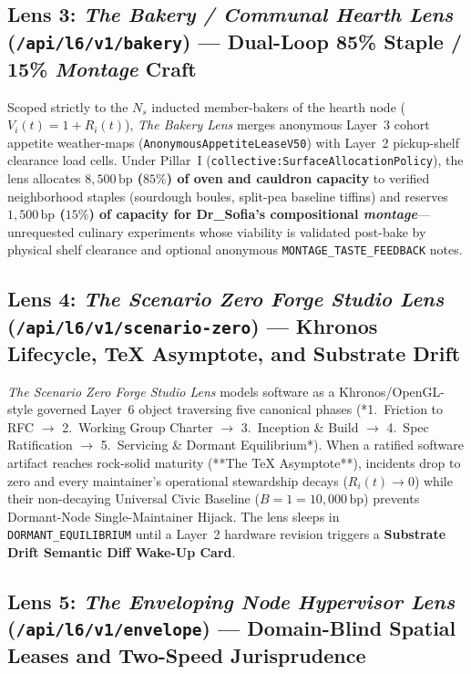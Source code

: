 \begin{enumerate}
\end{enumerate}

\subsection{Lens 3: \textit{The Bakery / Communal Hearth Lens} (\texttt{/api/l6/v1/bakery}) --- Dual-Loop 85\% Staple / 15\% \textit{Montage} Craft}
\label{subsec:lens-bakery}

Scoped strictly to the $N_s$ inducted member-bakers of the hearth node ($V_i(t) = 1 + R_i(t)$), \textit{The Bakery Lens} merges anonymous Layer~3 cohort appetite weather-maps (\texttt{AnonymousAppetiteLeaseV50}) with Layer~2 pickup-shelf clearance load cells. Under Pillar~I (\texttt{collective:SurfaceAllocationPolicy}), the lens allocates \textbf{$8{,}500\,\mathrm{bp}$ ($85\%$) of oven and cauldron capacity} to verified neighborhood staples (sourdough boules, split-pea baseline tiffins) and reserves \textbf{$1{,}500\,\mathrm{bp}$ ($15\%$) of capacity for Dr\_Sofia's compositional \textit{montage}}---unrequested culinary experiments whose viability is validated post-bake by physical shelf clearance and optional anonymous \texttt{MONTAGE\_TASTE\_FEEDBACK} notes.

\subsection{Lens 4: \textit{The Scenario Zero Forge Studio Lens} (\texttt{/api/l6/v1/scenario-zero}) --- Khronos Lifecycle, \TeX{} Asymptote, and Substrate Drift}
\label{subsec:lens-forge-studio}

\textit{The Scenario Zero Forge Studio Lens} models software as a Khronos/OpenGL-style governed Layer~6 object traversing five canonical phases (*1.~Friction to RFC $\to$ 2.~Working Group Charter $\to$ 3.~Inception \& Build $\to$ 4.~Spec Ratification $\to$ 5.~Servicing \& Dormant Equilibrium*). When a ratified software artifact reaches rock-solid maturity (**The \TeX{} Asymptote**), incidents drop to zero and every maintainer's operational stewardship decays ($R_i(t) \to 0$) while their non-decaying Universal Civic Baseline ($B = 1 = 10{,}000\,\mathrm{bp}$) prevents Dormant-Node Single-Maintainer Hijack. The lens sleeps in \texttt{DORMANT\_EQUILIBRIUM} until a Layer~2 hardware revision triggers a \textbf{Substrate Drift Semantic Diff Wake-Up Card}.

\subsection{Lens 5: \textit{The Enveloping Node Hypervisor Lens} (\texttt{/api/l6/v1/envelope}) --- Domain-Blind Spatial Leases and Two-Speed Jurisprudence}
\label{subsec:lens-enveloping-hypervisor}

